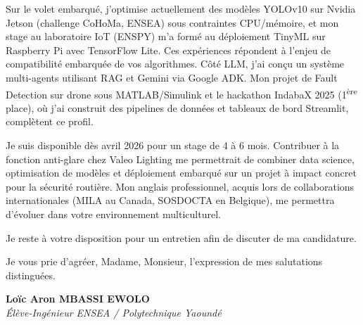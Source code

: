 \documentclass[a4paper,11pt]{article}
\begin{document}
Sur le volet embarqué, j'optimise actuellement des modèles YOLOv10 sur Nvidia Jetson (challenge CoHoMa, ENSEA) sous contraintes CPU/mémoire, et mon stage au laboratoire IoT (ENSPY) m'a formé au déploiement TinyML sur Raspberry Pi avec TensorFlow Lite. Ces expériences répondent à l'enjeu de compatibilité embarquée de vos algorithmes. Côté LLM, j'ai conçu un système multi-agents utilisant RAG et Gemini via Google ADK. Mon projet de Fault Detection sur drone sous MATLAB/Simulink et le hackathon IndabaX 2025 (1\textsuperscript{ère} place), où j'ai construit des pipelines de données et tableaux de bord Streamlit, complètent ce profil.

Je suis disponible dès avril 2026 pour un stage de 4 à 6 mois. Contribuer à la fonction anti-glare chez Valeo Lighting me permettrait de combiner data science, optimisation de modèles et déploiement embarqué sur un projet à impact concret pour la sécurité routière. Mon anglais professionnel, acquis lors de collaborations internationales (MILA au Canada, SOSDOCTA en Belgique), me permettra d'évoluer dans votre environnement multiculturel.

Je reste à votre disposition pour un entretien afin de discuter de ma candidature.

Je vous prie d'agréer, Madame, Monsieur, l'expression de mes salutations distinguées.

\vspace{0.8cm}

\textbf{Loïc Aron MBASSI EWOLO}\\
\textit{Élève-Ingénieur ENSEA / Polytechnique Yaoundé}
\end{document}
